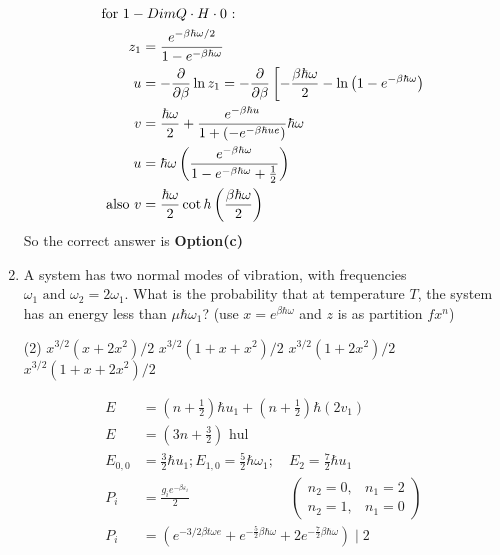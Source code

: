 \begin{enumerate}
\begin{answer}
	\begin{align*}
	\intertext{for $1-Dim Q \cdot H \cdot 0$ :}
	z_{1}&=\frac{e^{-\beta \hbar \omega / 2}}{1-e^{-\beta \hbar \omega}}\\
	u&=-\frac{\partial}{\partial \beta} \ln z_{1}=-\frac{\partial}{\partial \beta}\left[-\frac{\beta \hbar \omega}{2}-\ln \left(1-e^{-\beta \hbar \omega}\right)\right.\\
	v&=\frac{\hbar \omega}{2}+\frac{e^{-\beta \hbar u}}{1+\left(-e^{-\beta \hbar u e}\right)} \hbar \omega\\
	u&=\hbar \omega\left(\frac{e^{-\beta \hbar \omega}}{1-e^{-\beta \hbar \omega}+\frac{1}{2}}\right)\\
	\text { also } v&=\frac{\hbar \omega}{2} \cot h\left(\frac{\beta \hbar \omega}{2}\right)
	\end{align*}
	So the correct answer is \textbf{Option(c)}
\end{answer}	
\item A system has two normal modes of vibration, with frequencies $\omega_{1}\text{ and }\omega_{2}=2\omega_{1}$. What is the probability that at temperature $T$, the system has an energy less than $\mu\hbar\omega_{1}$? (use $x=e^{\beta \hbar \omega}$ and $z$ is as partition $fx^n$)
	\begin{tasks}(2)
		\task[\textbf{a.}]$x^{3 / 2}\left(x+2 x^{2}\right) / 2$
		\task[\textbf{b.}]$x^{3 / 2}\left(1+x+x^{2}\right) / 2$
		\task[\textbf{c.}] $x^{3 / 2}\left(1+2 x^{2}\right) / 2$
		\task[\textbf{d.}] $x^{3 / 2}\left(1+x+2 x^{2}\right) / 2$
	\end{tasks}
\begin{answer}
	\begin{align*}
	E&=\left(n+\frac{1}{2}\right) \hbar u_{1}+\left(n+\frac{1}{2}\right) \hbar\left(2 v_{1}\right)\\
	E&=\left(3 n+\frac{3}{2}\right) \text { hul }\\
	E_{0,0}&=\frac{3}{2} \hbar u_{1} ; E_{1,0}=\frac{5}{2} \hbar \omega_{1}; \quad E_{2}=\frac{7}{2} \hbar u_{1}\\
	P_{i}&=\frac{g_{i} e^{-\beta \varepsilon_{i}}}{2}\hspace{3cm}\left(\begin{array}{ll}
	n_{2}=0, & n_{1}=2 \\
	n_{2}=1, & n_{1}=0
	\end{array}\right)\\
	P_{i}&=\left(e^{-3 / 2 \beta t \omega e}+e^{-\frac{5}{2} \beta \hbar \omega}+2 e^{-\frac{7}{2} \beta \hbar \omega}\right) \mid 2\\

\end{align*}
\end{answer}
\end{enumerate}
